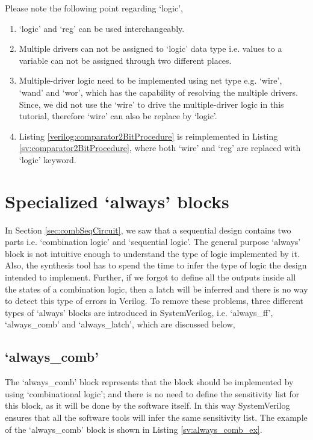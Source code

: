 \begin{noNumBox}
	Please note the following point regarding `logic', 
	\begin{enumerate}
		\item `logic' and `reg' can be used interchangeably. 
		\item Multiple drivers can not be assigned to `logic' data type i.e. values to a variable can not be assigned through two different places. 
		\item Multiple-driver logic need to be implemented using net type e.g. `wire', `wand' and `wor', which has the capability of resolving the multiple drivers. Since, we did not use the `wire' to drive the multiple-driver logic in this tutorial, therefore `wire' can also be replace by `logic'.
		\item Listing \ref{verilog:comparator2BitProcedure} is reimplemented in Listing \ref{sv:comparator2BitProcedure}, where both `wire' and `reg' are replaced with `logic' keyword. 
	\end{enumerate}
\end{noNumBox}



\section{Specialized `always' blocks}\label{sec:specialAlwaysBlk}
In Section \ref{sec:combSeqCircuit}, we saw that a sequential design contains two parts i.e. `combination logic' and `sequential logic'. The general purpose `always' block is not intuitive enough to understand the type of logic implemented by it. Also, the synthesis tool has to spend the time to infer the type of logic the design intended to implement. Further, if we forgot to define all the outputs inside all the states of a combination logic, then a latch will be inferred and there is no way to detect this type of errors in Verilog. To remove these problems, three different types of `always' blocks are introduced in SystemVerilog, i.e. `always\_ff', `always\_comb' and `always\_latch', which are discussed below, 

\subsection{`always\_comb'}
The `always\_comb' block represents that the block should be implemented by using `combinational logic'; and there is no need to define the sensitivity list for this block, as it will be done by the software itself. In this way SystemVerilog ensures that all the software tools will infer the same sensitivity list. The example of the `always\_comb' block is shown in Listing \ref{sv:always_comb_ex}. 

